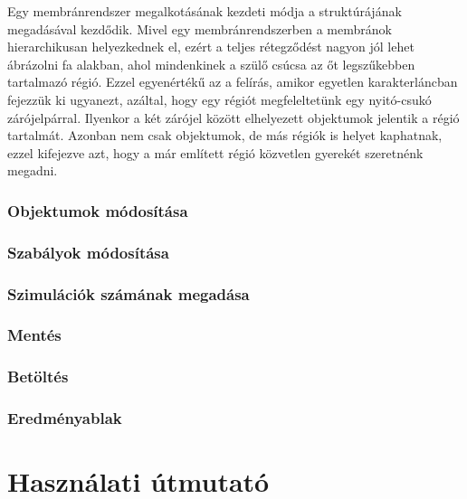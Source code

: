 Egy membránrendszer megalkotásának kezdeti módja a struktúrájának megadásával kezdődik. Mivel egy membránrendszerben a membránok hierarchikusan helyezkednek el, ezért a teljes rétegződést nagyon jól lehet ábrázolni fa alakban, ahol mindenkinek a szülő csúcsa az őt legszűkebben tartalmazó régió. Ezzel egyenértékű az a felírás, amikor egyetlen karakterláncban fejezzük ki ugyanezt, azáltal, hogy egy régiót megfeleltetünk egy nyitó-csukó zárójelpárral. Ilyenkor a két zárójel között elhelyezett objektumok jelentik a régió tartalmát. Azonban nem csak objektumok, de más régiók is helyet kaphatnak, ezzel kifejezve azt, hogy a már említett régió közvetlen gyerekét szeretnénk megadni. 

\subsubsection{Objektumok módosítása}
\subsubsection{Szabályok módosítása}
\subsubsection{Szimulációk számának megadása}
\subsubsection{Mentés}
\subsubsection{Betöltés}
\subsubsection{Eredményablak}

\section{Használati útmutató}\label{help}